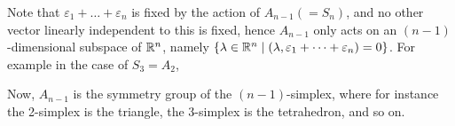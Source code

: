 Note that $\varepsilon_1 + \dots + \varepsilon_n$ is fixed by the action of
$A_{n-1} (= S_n)$, and no other vector linearly independent to this is fixed,
hence $A_{n-1}$ only acts on an $(n-1)$-dimensional subspace of $\mathbb{R}^n$, namely
$\{\lambda \in \mathbb{R}^n \mid (\lambda, \varepsilon_1 + \dots + \varepsilon_n) = 0\}$.
For example in the case of $S_3 = A_2$,


Now, $A_{n-1}$ is the symmetry group of the $(n-1)$-simplex, where for instance
the 2-simplex is the triangle, the 3-simplex is the tetrahedron, and so on.
